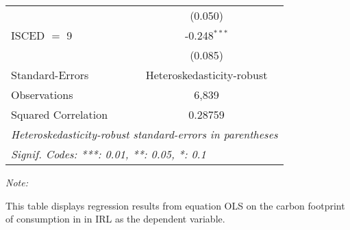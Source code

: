 \begin{table}[htbp!]
\begin{adjustbox}{width = 1\textwidth, max height = 0.95\textheight, center}
\begin{threeparttable}[b]
\begin{tabular}{lc}
                                & (0.050)\\   
            ISCED $=$ 9         & -0.248$^{***}$\\   
                                & (0.085)\\   
            \midrule 
            Standard-Errors     & Heteroskedasticity-robust \\   
            Observations        & 6,839\\  
            Squared Correlation & 0.28759\\  
            \midrule \midrule
            \multicolumn{2}{l}{\emph{Heteroskedasticity-robust standard-errors in parentheses}}\\
            \multicolumn{2}{l}{\emph{Signif. Codes: ***: 0.01, **: 0.05, *: 0.1}}\\
         \end{tabular}
         
         \begin{tablenotes}\item \medskip \textit{Note:}
            \item This table displays regression results from equation OLS on the carbon footprint of consumption in  in IRL as the dependent variable.  
         \end{tablenotes}
      \end{threeparttable}
   \end{adjustbox}
\end{table}


